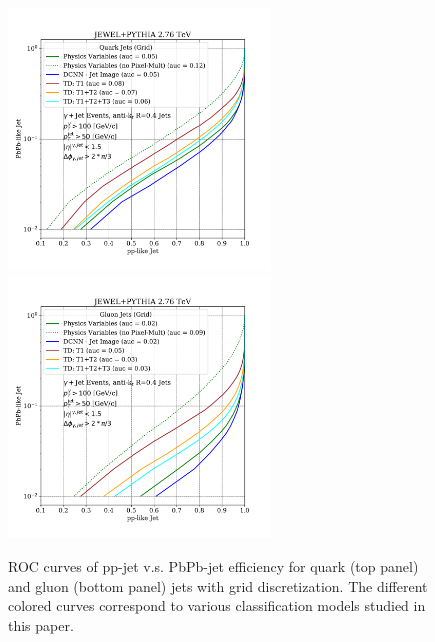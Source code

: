 \documentclass[notoc,preprintnumbers]{JHEP3}
\begin{document}
\begin{figure}[t]
	   \centering
	   \includegraphics[width=0.62\textwidth]{plots/JEWELPYTHIA_2p76TeV_quark_ppvspbpb.pdf}
	   \includegraphics[width=0.62\textwidth]{plots/JEWELPYTHIA_2p76TeV_gluon_ppvspbpb.pdf}
	   \caption{ROC curves of pp-jet v.s. PbPb-jet efficiency for quark (top panel) and gluon (bottom panel) jets with grid discretization. The different colored curves correspond to various classification models studied in this paper.}
\label{fig:ROC_qq_gg}
\end{figure}
\end{document}
